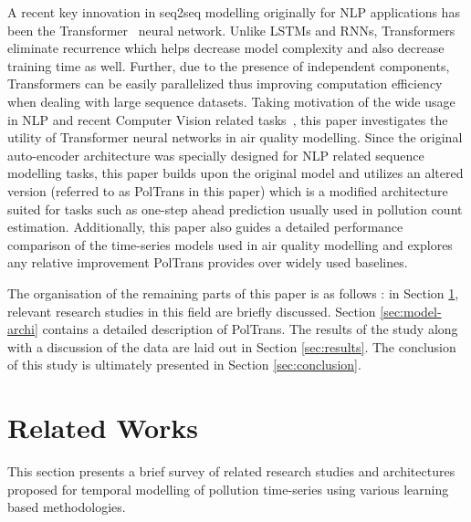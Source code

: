 \documentclass[twocolumn]{svjour3}          %
\begin{document}
A recent key innovation in seq2seq modelling originally for NLP applications has been the Transformer~\cite{Vaswani.2017} neural network. Unlike LSTMs and RNNs, Transformers eliminate recurrence which helps decrease model complexity and also decrease training time as well. Further, due to the presence of independent components, Transformers can be easily parallelized thus improving computation efficiency when dealing with large sequence datasets. Taking motivation of the wide usage in NLP and recent Computer Vision related tasks~\cite{Parmer.2018}, this paper investigates the utility of Transformer neural networks in air quality modelling. Since the original auto-encoder architecture was specially designed for NLP related sequence modelling tasks, this paper builds upon the original model and utilizes an altered version (referred to as {PolTrans} in this paper) which is a modified architecture suited for tasks such as one-step ahead prediction usually used in pollution count estimation. Additionally, this paper also guides a detailed performance comparison of the time-series models used in air quality modelling and explores any relative improvement {PolTrans} provides over widely used baselines.

The organisation of the remaining parts of this paper is as follows : in Section \ref{sec:related-works}, relevant research studies in this field are briefly discussed. Section \ref{sec:model-archi} contains a detailed description of {PolTrans}. The results of the study along with a discussion of the data are laid out in Section \ref{sec:results}. The conclusion of this study is ultimately presented in Section \ref{sec:conclusion}.


\section{Related Works}
\label{sec:related-works}

This section presents a brief survey of related research studies and architectures proposed for temporal modelling of pollution time-series using various learning based methodologies.
\end{document}
